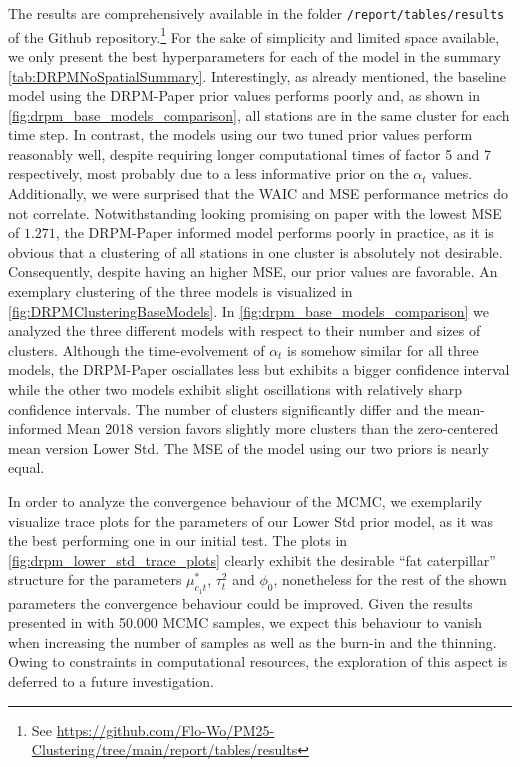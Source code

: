 \documentclass[12pt,a4paper]{article}
\begin{document}
The results are comprehensively available in the folder \texttt{/report/tables/results} of the Github
repository.\footnote{See \url{https://github.com/Flo-Wo/PM25-Clustering/tree/main/report/tables/results}}
For the sake of simplicity and limited space available, we only present the best hyperparameters for each of the model
in the summary \cref{tab:DRPMNoSpatialSummary}. Interestingly, as already mentioned, the baseline model using the 
DRPM-Paper prior values performs poorly and, as shown in \cref{fig:drpm_base_models_comparison}, all stations are in
the same cluster for each time step. In contrast, the models using our two tuned prior values perform reasonably well,
despite requiring longer computational times of factor 5 and 7 respectively, most probably due to a less informative
prior on the $\alpha_t$ values. Additionally, we were surprised that the WAIC and MSE performance metrics do not correlate.
Notwithstanding looking promising on paper with the lowest MSE of $1.271$, the DRPM-Paper informed model performs poorly in practice,
as it is obvious that a clustering of all stations in one cluster is absolutely not desirable. Consequently, despite having
an higher MSE, our prior values are favorable. An exemplary clustering of the three models is visualized in 
\cref{fig:DRPMClusteringBaseModels}. In \cref{fig:drpm_base_models_comparison} we analyzed the three different models
with respect to their number and sizes of clusters. Although the time-evolvement of $\alpha_t$ is somehow similar for all
three models, the DRPM-Paper osciallates less but exhibits a bigger
confidence interval while the other two models exhibit slight
oscillations with relatively sharp confidence intervals.
The number of clusters significantly differ and the mean-informed Mean 2018 version favors slightly more
clusters than the zero-centered mean version Lower Std. The MSE of the model using our two priors is nearly equal.


In order to analyze the convergence behaviour of the MCMC, we exemplarily visualize trace plots for the parameters of
our Lower Std prior model, as it was the best performing one in our initial test. The plots in
\cref{fig:drpm_lower_std_trace_plots} clearly exhibit the desirable \enquote{fat caterpillar} structure for the
parameters $\mu^*_{c_1t}$, $\tau_t^2$ and $\phi_0$, nonetheless for the rest of the shown parameters the convergence
behaviour could be improved. Given the results presented in \cite[Section 4.1]{Page2021-Temporal} with 50.000 MCMC samples,
we expect this behaviour to vanish when increasing the number of samples as well as the burn-in and the thinning.
Owing to constraints in computational resources, the exploration of this aspect is deferred to a future investigation.
\end{document}
